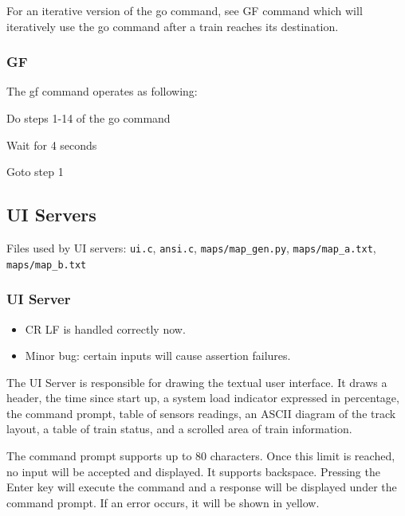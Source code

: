 \documentclass[letterpaper]{article}
\begin{document}
For an iterative version of the go command, see GF command which will iteratively use the go command after a train reaches its destination.


\subsubsection{GF%
  \label{gf}%
}

The gf command operates as following:
\setcounter{listcnt0}{0}
\begin{list}{.}
{
\setlength{\rightmargin}{\leftmargin}
}

\item Do steps 1-14 of the go command

\item Wait for 4 seconds

\item Goto step 1
\end{list}


\subsection{UI Servers%
  \label{ui-servers}%
}

Files used by UI servers: \texttt{ui.c}, \texttt{ansi.c}, \texttt{maps/map\_gen.py}, \texttt{maps/map\_a.txt}, \texttt{maps/map\_b.txt}


\subsubsection{UI Server%
  \label{ui-server}%
}
%
\begin{itemize}

\item CR LF is handled correctly now.

\item Minor bug: certain inputs will cause assertion failures.

\end{itemize}

The UI Server is responsible for drawing the textual user interface. It draws a header, the time since start up, a system load indicator expressed in percentage, the command prompt, table of sensors readings, an ASCII diagram of the track layout, a table of train status, and a scrolled area of train information.

The command prompt supports up to 80 characters. Once this limit is reached, no input will be accepted and displayed. It supports backspace. Pressing the Enter key will execute the command and a response will be displayed under the command prompt. If an error occurs, it will be shown in yellow.
\end{document}
